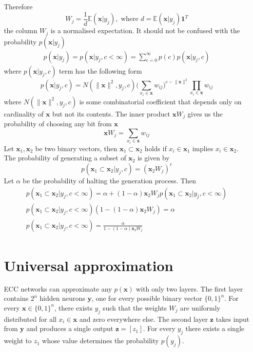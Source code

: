 \documentclass[12pt]{article}
\begin{document}
Therefore
\[
W_j = \frac{1}{d}\mathbb{E}(\boldsymbol{x}|y_j), \text{ where }d=\mathbb{E}(\boldsymbol{x}|y_j)\boldsymbol{1}^{T} 
\]
 the column $W_j$ is a normalised expectation. It should not be confused with the probability $p(\boldsymbol{x}|y_j)$
 \begin{gather*} 
p(\boldsymbol{x}|y_j) = p(\boldsymbol{x}|y_j,c<\infty) = \sum_{c=0}^{\infty} p(c) p(\boldsymbol{x}|y_j,c)
 \end{gather*}
where $p(\boldsymbol{x}|y_j,c)$ term has the following form
\[
p(\boldsymbol{x}|y_j,c) = N(\lVert\boldsymbol{x} \rVert^2 ,y_j,c)\big(\sum_{x_i\in\boldsymbol{x}} w_{ij}\big)^{ c - \lVert\boldsymbol{x} \rVert^2  }\prod_{x_i\in\boldsymbol{x}} w_{ij}
\]
where $N(\lVert\boldsymbol{x} \rVert^2 ,y_j,c)$ is some combinatorial coefficient that depends only on cardinality of $\boldsymbol{x}$ but not its contents. The inner product  $\boldsymbol{x}W_j$ gives us the probability of choosing any bit from $\boldsymbol{x}$
\[
\boldsymbol{x}W_j = \sum_{x_i\in\boldsymbol{x}} w_{ij}
\]
Let $\boldsymbol{x}_1, \boldsymbol{x}_2$ be two binary vectors, then $\boldsymbol{x}_1 \subset \boldsymbol{x}_2$ holds if $x_i\in\boldsymbol{x}_1$ implies $x_i\in\boldsymbol{x}_2$. The probability of generating a subset of $\boldsymbol{x}_2$ is given by
\[
p(\boldsymbol{x}_1 \subset \boldsymbol{x}_2|y_j,c) = (\boldsymbol{x}_2W_j)^c
\]
Let $\alpha$ be the probability of halting the generation process. Then 
\begin{gather*}
p(\boldsymbol{x}_1 \subset \boldsymbol{x}_2|y_j,c<\infty) = \alpha + (1-\alpha)\boldsymbol{x}_2W_j p(\boldsymbol{x}_1 \subset \boldsymbol{x}_2|y_j,c<\infty) \\
p(\boldsymbol{x}_1 \subset \boldsymbol{x}_2|y_j,c<\infty)(1-(1-\alpha)\boldsymbol{x}_2W_j ) = \alpha \\
p(\boldsymbol{x}_1 \subset \boldsymbol{x}_2|y_j,c<\infty) = \frac{\alpha}{1-(1-\alpha)\boldsymbol{x}_2W_j } \\
\end{gather*}

\section{Universal approximation}

ECC networks can approximate any $p(\boldsymbol{x})$ with only two layers. The first layer contains $2^n$ hidden neurons $\boldsymbol{y}$, one for every possible binary vector $\{0,1\}^n$. For every $\boldsymbol{x} \in \{0,1\}^n$, there exists $y_j$ such that the weights $W_j$ are uniformly distributed for all $x_i \in \boldsymbol{x}$ and zero everywhere else. The second layer $\boldsymbol{z}$ takes input from $\boldsymbol{y}$ and produces a single output $\boldsymbol{z}=[z_1]$. For every $y_j$ there exists a single weight to $z_1$ whose value determines the probability $p(y_j)$. 
 
\end{document}
